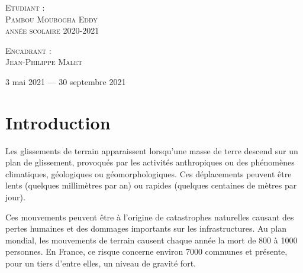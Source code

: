 \documentclass[11pt, openany]{report}
\begin{document}
\begin{titlepage}
\begin{sffamily}
\begin{center}
    \begin{minipage}{0.4\textwidth}
      \begin{flushleft} \large
      	\textsc{Etudiant :}\\ 
        \textsc{Pambou Moubogha Eddy}\\
         \textsc{année scolaire 2020-2021}\\
      \end{flushleft}
    \end{minipage}
    \begin{minipage}{0.4\textwidth}
      \begin{flushright} \large
        \textsc{Encadrant :}\\ 
        \textsc{Jean-Philippe Malet}\\
      \end{flushright}
    \end{minipage}

    \vfill

    {\large 3 mai 2021 — 30 septembre 2021}

  \end{center}
  \end{sffamily}
\end{titlepage}
\newpage

\chapter{Introduction}
Les glissements de terrain apparaissent lorsqu'une masse de terre descend sur un plan de glissement, provoqués par les activités anthropiques ou des phénomènes climatiques, géologiques ou géomorphologiques.
Ces déplacements peuvent être lents (quelques millimètres par an) ou rapides (quelques centaines de mètres par jour). \par

Ces mouvements peuvent être à l'origine de catastrophes naturelles causant des pertes humaines et des dommages importants sur les infrastructures. Au plan mondial, les mouvements de terrain causent chaque année la mort de 800 à 1000 personnes. En France, ce risque concerne environ 7000 communes et présente, pour un tiers d’entre elles, un niveau de gravité fort.\par
\end{document}
